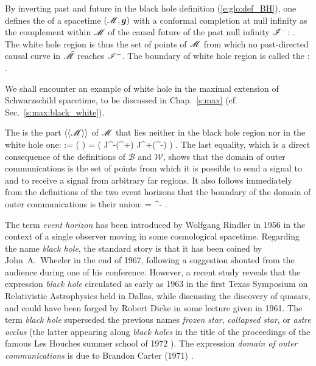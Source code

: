 By inverting past and future in the black hole definition (\ref{e:glo:def_BH}), one defines
the  of a
spacetime $(\mathscr{M},\bm{g})$ with a conformal completion at null infinity as the
complement within $\mathscr{M}$ of the causal future of the past null infinity $\mathscr{I}^-$:
\be \label{e:glo:def_white_hole}
     .
\ee
The white hole region is thus the set of points of $\mathscr{M}$
from which no past-directed causal curve in $\tilde{\mathscr{M}}$ reaches $\mathscr{I}^-$.
The boundary of white hole region is called the
:
\be
     .
\ee

\begin{example}
We shall encounter an example of white hole in the maximal extension of
Schwarzschild spacetime, to be discussed in Chap.~\ref{s:max} (cf. Sec.~\ref{s:max:black_white}).
\end{example}

The 
is the part $\langle\langle \mathscr{M}\rangle\rangle$ of $\mathscr{M}$ that lies neither
in the black hole region nor in the white hole one:
\be
    \langle\langle \M\rangle\rangle := \M\setminus (\cup {} )
            = \left( J^-(\scri^+) \cap J^+(\scri^-) \right) \cap \M .
\ee
The last equality, which is a direct consequence of the definitions of
$\mathscr{B}$ and $\mathscr{W}$, shows that the domain of outer communications
is the set of points from which it is possible to send a signal to and to
receive a signal from arbitrary far regions.
It also follows immediately from the definitions of the two event horizons
that the boundary of the domain of outer communications is their union:
\be
    \partial \langle\langle \M\rangle\rangle  = \Hor \cup \Hor^- .
\ee

\begin{hist} \label{h:glo:black_hole_name}
The term \emph{event horizon} has been introduced by Wolfgang Rindler in 1956 \cite{Rindl56}
in the context of a single observer moving in some cosmological spacetime.
Regarding the name \emph{black hole}, the standard
story is that it has been coined by John~A.~Wheeler in the end of 1967,
following a suggestion shouted from the audience during one of his conference.
However, a recent study \cite{HerdeL18} reveals that the expression \emph{black hole}
circulated as early as 1963 in the first Texas Symposium on Relativistic Astrophysics
held in Dallas,
while discussing the discovery of quasars, and could have been forged by
Robert Dicke in some lecture given in 1961.
The term \emph{black hole} superseded the previous names
\emph{frozen star}, \emph{collapsed star}, or \emph{astre occlus}
(the latter appearing along \emph{black holes} in the title of
the proceedings of the famous Les Houches summer school of 1972 \cite{DeWit73}).
The expression \emph{domain of outer communications} is due to
Brandon Carter
(1971) \cite{Carte71}.
\end{hist}


